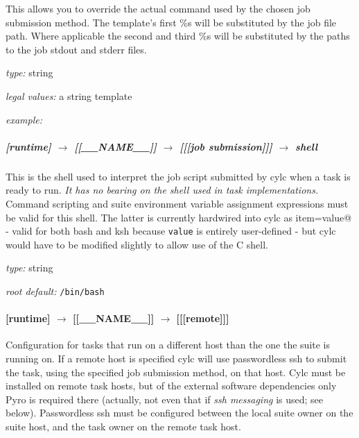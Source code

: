 This allows you to override the actual command used by the chosen job
submission method. The template's first \%s will be substituted by the
job file path.  Where applicable the second and third \%s will be
substituted by the paths to the job stdout and stderr files.

\begin{myitemize}
\item {\em type:} string
\item {\em legal values:} a string template
\item {\em example:} \lstinline@llsubmit %s@
\end{myitemize}

\subparagraph[shell]{[runtime] $\rightarrow$ [[\_\_NAME\_\_]] $\rightarrow$ [[[job submission]]] $\rightarrow$ shell}
\label{JobSubShell}

This is the shell used to interpret the job script submitted by cylc
when a task is ready to run.  {\em It has no bearing on the shell used
in task implementations.} Command scripting and suite environment 
variable assignment expressions must be valid for this shell. The 
latter is currently hardwired into cylc as 
\lstinline@export item=value@ - valid for both bash and ksh
because \lstinline=value= is entirely user-defined - but cylc would have
to be modified slightly to allow use of the C shell.

\begin{myitemize}
\item {\em type:} string
\item {\em root default:} \lstinline=/bin/bash= 
\end{myitemize}


\paragraph[{[[[}remote{]]]}]{[runtime] $\rightarrow$ [[\_\_NAME\_\_]] $\rightarrow$ [[[remote]]]}

Configuration for tasks that run on a different host than the one the suite 
is running on. If a remote host is specified cylc will use passwordless
ssh to submit the task, using the specified job submission method, on
that host. Cylc must be installed on remote task hosts, but of the
external software dependencies only Pyro 
is required there (actually, not even that if {\em ssh messaging} is
used; see below). Passwordless ssh must be configured between the local
suite owner on the suite host, and the task owner on the remote task
host.

